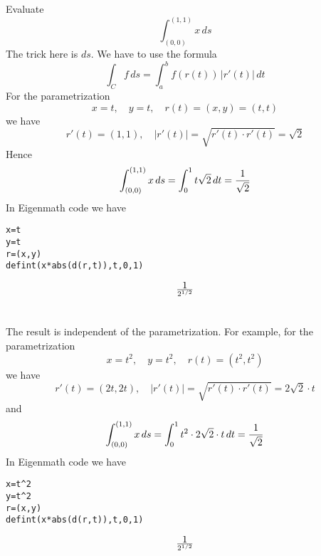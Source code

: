 \documentclass{article}
\begin{document}
\section*{}
Evaluate
$$\int_{(0,0)}^{(1,1)} x\,ds$$
The trick here is $ds$. We have to use the formula
$$\int_C f\,ds=\int_a^b f(r(t))\,|r'(t)|\,dt$$
For the parametrization
$$x=t,\quad y=t,\quad r(t)=(x,y)=(t,t)$$
we have
$$r'(t)=(1,1),\quad |r'(t)|=\sqrt{r'(t)\cdot r'(t)}=\sqrt2$$
Hence
$$\int_{(0,0)}^{(1,1)} x\,ds=\int_0^1t\sqrt2\,dt={1\over\sqrt2}$$
In Eigenmath code we have
\begin{verbatim}
x=t
y=t
r=(x,y)
defint(x*abs(d(r,t)),t,0,1)
\end{verbatim}
$$1\over2^{1/2}$$

\section*{}
The result is independent of the parametrization.
For example, for the parametrization
$$x=t^2,\quad y=t^2,\quad r(t)=(t^2,t^2)$$
we have
$$r'(t)=(2t,2t),\quad |r'(t)|=\sqrt{r'(t)\cdot r'(t)}=2\sqrt2\cdot t$$
and
$$\int_{(0,0)}^{(1,1)} x\,ds=\int_0^1t^2\cdot2\sqrt2\cdot t\,dt={1\over\sqrt2}$$
In Eigenmath code we have
\begin{verbatim}
x=t^2
y=t^2
r=(x,y)
defint(x*abs(d(r,t)),t,0,1)
\end{verbatim}
$$1\over2^{1/2}$$
\end{document}
